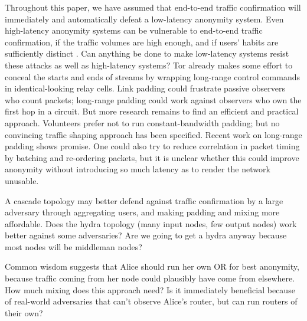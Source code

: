 \documentclass[times,10pt,twocolumn]{article}
\begin{document}
Throughout this paper, we have assumed that end-to-end traffic
confirmation will immediately and automatically defeat a low-latency
anonymity system. Even high-latency anonymity systems can be
vulnerable to end-to-end traffic confirmation, if the traffic volumes
are high enough, and if users' habits are sufficiently distinct
\cite{limits-open,statistical-disclosure}. Can anything be done to
make low-latency systems resist these attacks as well as high-latency
systems? Tor already makes some effort to conceal the starts and ends of
streams by wrapping long-range control commands in identical-looking
relay cells. Link padding could frustrate passive observers who count
packets; long-range padding could work against observers who own the
first hop in a circuit. But more research remains to find an efficient
and practical approach. Volunteers prefer not to run constant-bandwidth
padding; but no convincing traffic shaping approach has been
specified. Recent work on long-range padding \cite{defensive-dropping}
shows promise. One could also try to reduce correlation in packet timing
by batching and re-ordering packets, but it is unclear whether this could
improve anonymity without introducing so much latency as to render the
network unusable.

A cascade topology may better defend against traffic confirmation by a
large adversary through aggregating users, and making padding and
mixing more affordable.  Does the hydra topology (many input nodes,
few output nodes) work better against some adversaries? Are we going
to get a hydra anyway because most nodes will be middleman nodes?

Common wisdom suggests that Alice should run her own OR for best
anonymity, because traffic coming from her node could plausibly have
come from elsewhere. How much mixing does this approach need?  Is it
immediately beneficial because of real-world adversaries that can't
observe Alice's router, but can run routers of their own?
\end{document}
